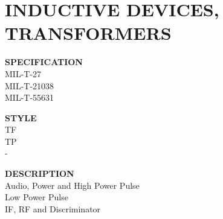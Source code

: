 \section{INDUCTIVE DEVICES, TRANSFORMERS}

\begin{minipage}[t]{0.24\textwidth}
    \textbf{SPECIFICATION}\\
    MIL-T-27\\MIL-T-21038\\MIL-T-55631
\end{minipage}
\hfill
\begin{minipage}[t]{0.12\textwidth}
    \textbf{STYLE}\\
    TF\\TP\\-
\end{minipage}
\hfill
\begin{minipage}[t]{0.61\textwidth}
    \textbf{DESCRIPTION}\\
    Audio, Power and High Power Pulse\\Low Power Pulse\\IF, RF and Discriminator
\end{minipage}

